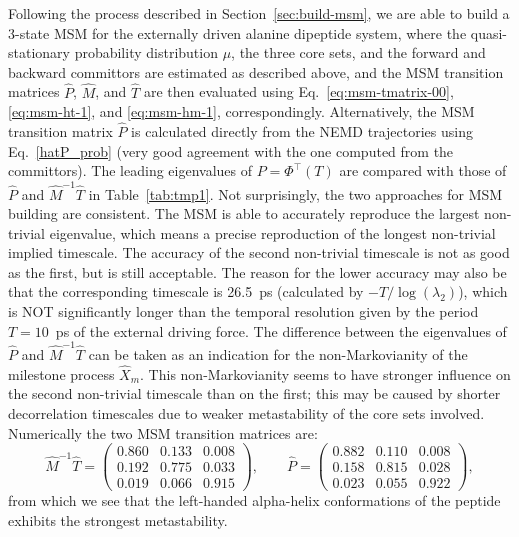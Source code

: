 \documentclass[journal=jctcce,manuscript=article]{achemso}
\newcommand{\myphi}{\Phi}
\begin{document}
Following the process described in Section~\ref{sec:build-msm}, we are able to build a 
3-state MSM for the externally driven alanine dipeptide system,
where the quasi-stationary probability distribution $\mu$, the three core sets, and the forward and backward committors are
estimated as described above, and the MSM transition matrices $\hat P$, $\hat{M}$, and $\hat{T}$ are then evaluated using Eq.~\eqref{eq:msm-tmatrix-00}, \eqref{eq:msm-ht-1}, and \eqref{eq:msm-hm-1}, correspondingly.
Alternatively, the MSM  transition matrix $\hat P$ is calculated directly from the NEMD trajectories using Eq.~\eqref{hatP_prob} (very good agreement with the one computed from the committors).
The leading eigenvalues of $P=\myphi^{\top}(T)$ are compared with those of $\hat P$ and $\hat{M}^{-1}\hat{T}$ in
Table~\ref{tab:tmp1}.
Not surprisingly, the two approaches for MSM building are consistent.
The MSM is able to accurately reproduce
the largest non-trivial eigenvalue, which means a precise reproduction
of the longest non-trivial implied timescale. The accuracy of the second non-trivial
timescale is not as good as the first, but is still acceptable.
The reason
for the lower accuracy may also be that
the corresponding timescale is 26.5~ps (calculated by $-T/\log(\lambda_2)$),
which is NOT significantly longer than the temporal resolution given by the period $T=10$~ps of the external driving force.
The difference between the eigenvalues of $\hat P$ and $\hat{M}^{-1}\hat T$
  can be taken as an indication for the non-Markovianity of the milestone process $\hat X_m$. This
  non-Markovianity seems to have stronger influence on the second non-trivial timescale than on the first; this may be caused by shorter decorrelation timescales due to weaker metastability of the core sets involved.
Numerically the two MSM transition matrices are:
\[
\hat{M}^{-1}\hat{T}=\left(\begin{array}{ccc}
   0.860 &   0.133 &   0.008 \\
    0.192  &  0.775  &  0.033\\
    0.019   & 0.066 &   0.915
\end{array}
\right),\qquad \hat{P}=\left(\begin{array}{ccc}
   0.882 &   0.110 &   0.008 \\
    0.158  &  0.815  &  0.028\\
    0.023   & 0.055 &   0.922
\end{array}
\right),
\]
from which we see that  the left-handed alpha-helix conformations of the peptide exhibits the strongest metastability. 
\end{document}
